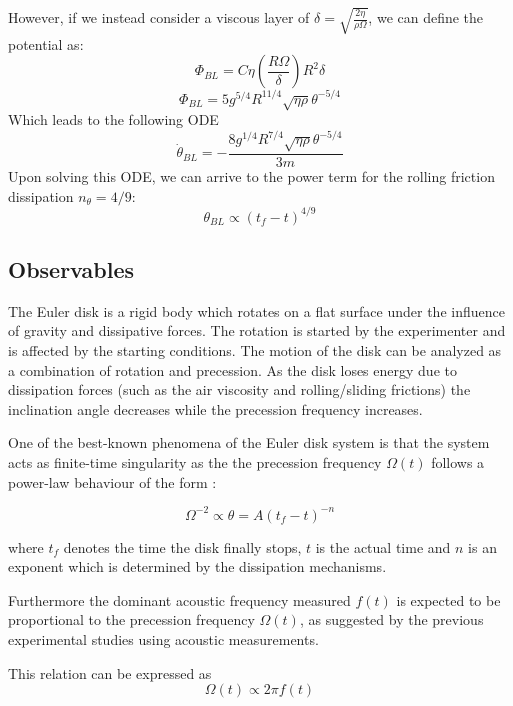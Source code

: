 \documentclass{article}
\begin{document}
However, if we instead consider a viscous layer of $\delta=\sqrt{\frac{2\eta}{\rho\Omega}}$, we can define the potential as:
\begin{equation}
    \Phi_{BL}=C\eta\left( \frac{R\Omega}{\delta} \right) R^2\delta
\end{equation}
\begin{equation}
    \Phi_{BL}=5g^{5/4}R^{11/4}\sqrt{\eta\rho}\theta^{-5/4}
\end{equation}
Which leads to the following ODE
\begin{equation}
    \dot\theta_{BL}=-\frac{8g^{1/4}R^{7/4}\sqrt{\eta\rho}\theta^{-5/4}}{3m}
\end{equation}
Upon solving this ODE, we can arrive to the power term for the rolling friction dissipation $n_{\theta}=4/9$:
\begin{equation}
    \theta_{BL}\propto(t_f-t)^{4/9}
\end{equation}

\subsection{Observables}
The Euler disk is a rigid body which rotates on a flat surface under the influence of gravity and dissipative forces. The rotation is started by the experimenter and is affected by the starting conditions. The motion of the disk can be analyzed as a combination of rotation and precession. As the disk loses energy due to dissipation forces (such as the air viscosity and rolling/sliding frictions) the inclination angle decreases while the precession frequency increases.

One of the best-known phenomena of the Euler disk system is that the system acts as finite-time singularity as the  the precession frequency $\Omega(t)$ follows a power-law behaviour of the form \autocite{Darmendrail2021}:

\[
\Omega^{-2} \propto \theta=A(t_f - t)^{-n}
\]

where $t_f$ denotes the time the disk finally stops, $t$ is the actual time and $n$ is an exponent which is determined by the dissipation mechanisms.

Furthermore the dominant acoustic frequency measured $f(t)$ is expected to be proportional to the precession frequency $\Omega(t)$, as suggested by the previous experimental studies using acoustic measurements.

This relation can be expressed as
\[
\Omega(t) \propto 2\pi f(t) 
\]
\end{document}
